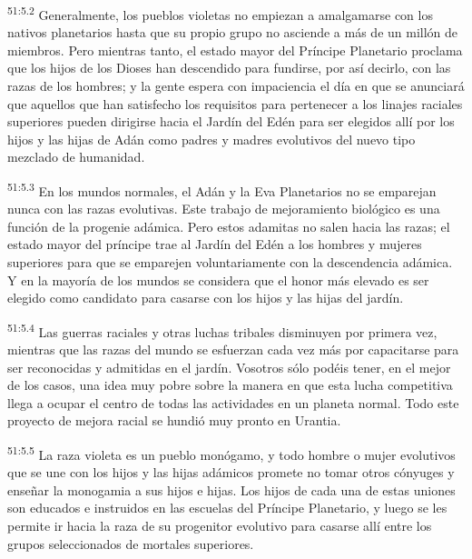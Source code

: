 \par
\textsuperscript{51:5.2} Generalmente, los pueblos violetas no empiezan a amalgamarse con los nativos planetarios hasta que su propio grupo no asciende a más de un millón de miembros. Pero mientras tanto, el estado mayor del Príncipe Planetario proclama que los hijos de los Dioses han descendido para fundirse, por así decirlo, con las razas de los hombres; y la gente espera con impaciencia el día en que se anunciará que aquellos que han satisfecho los requisitos para pertenecer a los linajes raciales superiores pueden dirigirse hacia el Jardín del Edén para ser elegidos allí por los hijos y las hijas de Adán como padres y madres evolutivos del nuevo tipo mezclado de humanidad.

\par
\textsuperscript{51:5.3} En los mundos normales, el Adán y la Eva Planetarios no se emparejan nunca con las razas evolutivas. Este trabajo de mejoramiento biológico es una función de la progenie adámica. Pero estos adamitas no salen hacia las razas; el estado mayor del príncipe trae al Jardín del Edén a los hombres y mujeres superiores para que se emparejen voluntariamente con la descendencia adámica. Y en la mayoría de los mundos se considera que el honor más elevado es ser elegido como candidato para casarse con los hijos y las hijas del jardín.

\par
\textsuperscript{51:5.4} Las guerras raciales y otras luchas tribales disminuyen por primera vez, mientras que las razas del mundo se esfuerzan cada vez más por capacitarse para ser reconocidas y admitidas en el jardín. Vosotros sólo podéis tener, en el mejor de los casos, una idea muy pobre sobre la manera en que esta lucha competitiva llega a ocupar el centro de todas las actividades en un planeta normal. Todo este proyecto de mejora racial se hundió muy pronto en Urantia.

\par
\textsuperscript{51:5.5} La raza violeta es un pueblo monógamo, y todo hombre o mujer evolutivos que se une con los hijos y las hijas adámicos promete no tomar otros cónyuges y enseñar la monogamia a sus hijos e hijas. Los hijos de cada una de estas uniones son educados e instruidos en las escuelas del Príncipe Planetario, y luego se les permite ir hacia la raza de su progenitor evolutivo para casarse allí entre los grupos seleccionados de mortales superiores.

